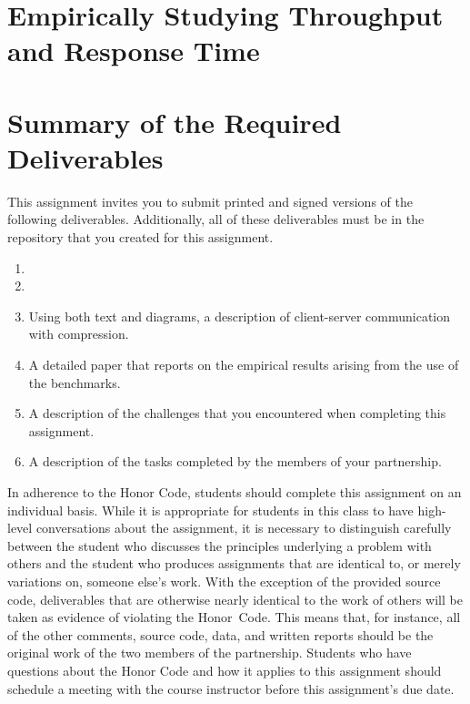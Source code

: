 \section*{Empirically Studying Throughput and Response Time}



\section*{Summary of the Required Deliverables}

This assignment invites you to submit printed and signed versions of the following deliverables. Additionally,
all of these deliverables must be in the repository that you created for this assignment.

\begin{enumerate}

    \item 

    \item 

    \item Using both text and diagrams, a description of client-server communication with compression.

    \item A detailed paper that reports on the empirical results arising from the use of the benchmarks.

    \item A description of the challenges that you encountered when completing this assignment.

    \item A description of the tasks completed by the members of your partnership.

\end{enumerate}

In adherence to the Honor Code, students should complete this assignment on an individual basis. While it is appropriate
for students in this class to have high-level conversations about the assignment, it is necessary to distinguish
carefully between the student who discusses the principles underlying a problem with others and the student who produces
assignments that are identical to, or merely variations on, someone else's work.  With the exception of the provided
source code, deliverables that are otherwise nearly identical to the work of others will be taken as evidence of
violating the \mbox{Honor Code}. This means that, for instance, all of the other comments, source code, data, and
written reports should be the original work of the two members of the partnership. Students who have questions about the
Honor Code and how it applies to this assignment should schedule a meeting with the course instructor before this
assignment's due date.


